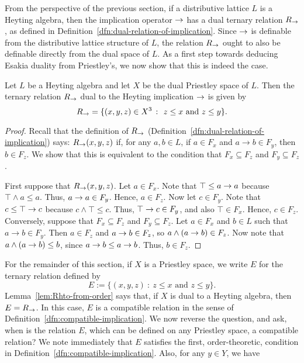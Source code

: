 From the perspective of the previous section, if a distributive lattice $L$ is a Heyting algebra, then the implication operator $\to$ has a dual ternary relation $R_{\to}$, as defined in Definition~\ref{dfn:dual-relation-of-implication}. Since $\to$ is definable from the distributive lattice structure of $L$, the relation $R_{\to}$ ought to also be definable directly from the dual space of $L$. As a first step towards deducing Esakia duality from Priestley's, we now show that this is indeed the case.
\begin{lemma}\label{lem:Rhto-from-order}
Let $L$ be a Heyting algebra and let $X$ be the dual Priestley space of $L$. Then the ternary relation $R_{\to}$ dual to the Heyting implication $\to$ is given by
\[ R_{\hto} = \{(x,y,z) \in X^3 \ \colon \ z \leq x \text{ and } z \leq y \}.\]
\end{lemma}
\begin{proof}
Recall that the definition of $R_{\to}$ (Definition~\ref{dfn:dual-relation-of-implication}) says: $R_{\to}(x,y,z)$ if, for any $a, b \in L$, if $a \in F_x$ and $a \to b \in F_y$, then $b \in F_z$. We show that this is equivalent to the condition that $F_x \subseteq F_z$ and $F_y \subseteq F_z$.

First suppose that $R_{\to}(x,y,z)$. Let $a \in F_x$. Note that $\top \leq a \to a$ because $\top \wedge a \leq a$. Thus, $a \to a \in F_y$. Hence, $a \in F_z$. Now let $c \in F_y$. Note that $c \leq \top \to c$ because $c \wedge \top \leq c$. Thus, $\top \to c \in F_y$, and also $\top \in F_x$. Hence, $c \in F_z$. Conversely, suppose that $F_x \subseteq F_z$ and $F_y \subseteq F_z$. Let $a \in F_x$ and $b \in L$ such that $a \to b \in F_y$. Then $a \in F_z$ and $a \to b \in F_z$, so $a \wedge (a \to b) \in F_z$. Now note that $a \wedge (a \to b) \leq b$, since $a \to b \leq a \to b$. Thus, $b \in F_z$.
\end{proof}
For the remainder of this section, if $X$ is a Priestley space, we write $E$ for the ternary relation defined by
\[ E := \{(x,y,z) \ \colon \ z \leq x \text{ and } z \leq y \}.\]
Lemma~\ref{lem:Rhto-from-order} says that, if $X$ is dual to a Heyting algebra, then $E = R_{\to}$. In this case, $E$ is a compatible relation in the sense of Definition~\ref{dfn:compatible-implication}. We now reverse the question, and ask, when is the relation $E$, which can be defined on any Priestley space, a compatible relation? We note immediately that $E$ satisfies the first, order-theoretic, condition in Definition~\ref{dfn:compatible-implication}. Also, for any $y \in Y$, we have
